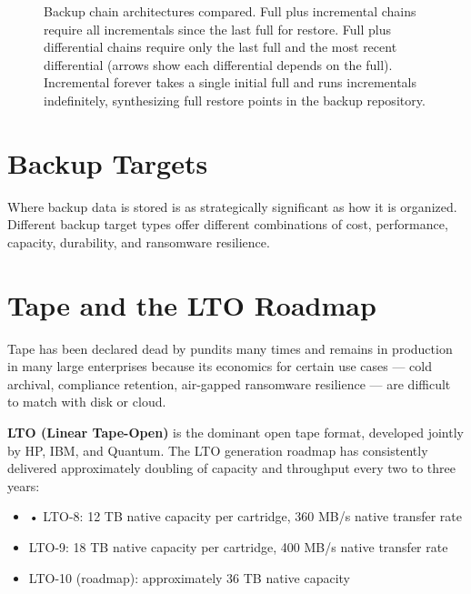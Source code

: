 \begin{figure}[htbp]
\caption{Backup chain architectures compared. Full plus incremental chains require all incrementals since the last full for restore. Full plus differential chains require only the last full and the most recent differential (arrows show each differential depends on the full). Incremental forever takes a single initial full and runs incrementals indefinitely, synthesizing full restore points in the backup repository.}
\label{fig:backup-chains}
\end{figure}

\section{Backup Targets}
Where backup data is stored is as strategically significant as how it is organized. Different backup target types offer different combinations of cost, performance, capacity, durability, and ransomware resilience.

\section{Tape and the LTO Roadmap}
Tape has been declared dead by pundits many times and remains in production in many large enterprises because its economics for certain use cases --- cold archival, compliance retention, air-gapped ransomware resilience --- are difficult to match with disk or cloud.

\textbf{LTO (Linear Tape-Open)} is the dominant open tape format, developed jointly by HP, IBM, and Quantum. The LTO generation roadmap has consistently delivered approximately doubling of capacity and throughput every two to three years:

\begin{itemize}
  \item • LTO-8: 12 TB native capacity per cartridge, 360 MB/s native transfer rate
  \item LTO-9: 18 TB native capacity per cartridge, 400 MB/s native transfer rate
  \item LTO-10 (roadmap): approximately 36 TB native capacity
\end{itemize}

